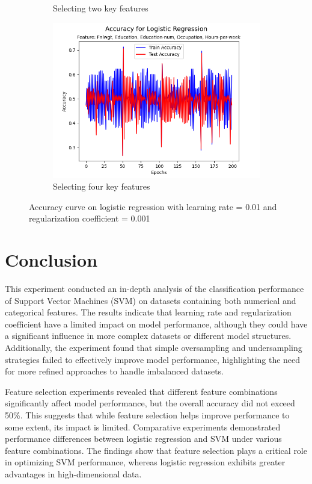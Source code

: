 \documentclass[a4paper, utf8]{ctexart}
\begin{document}
\begin{figure}[htbp]
\begin{subfigure}{.32\textwidth}
			\caption{Selecting two key features}
		\end{subfigure}
		\begin{subfigure}{.32\textwidth}
			\centering
			\includegraphics[width=.9\textwidth]{./figure/myplotL3.png}
			\caption{Selecting four key features}
		\end{subfigure}
		\caption{Accuracy curve on logistic regression with learning rate = 0.01 and regularization coefficient = 0.001}
	\end{figure}
	
	\section{Conclusion}
	
	This experiment conducted an in-depth analysis of the classification performance of Support Vector Machines (SVM) on datasets containing both numerical and categorical features. The results indicate that learning rate and regularization coefficient have a limited impact on model performance, although they could have a significant influence in more complex datasets or different model structures. Additionally, the experiment found that simple oversampling and undersampling strategies failed to effectively improve model performance, highlighting the need for more refined approaches to handle imbalanced datasets.
	
	Feature selection experiments revealed that different feature combinations significantly affect model performance, but the overall accuracy did not exceed 50\%. This suggests that while feature selection helps improve performance to some extent, its impact is limited. Comparative experiments demonstrated performance differences between logistic regression and SVM under various feature combinations. The findings show that feature selection plays a critical role in optimizing SVM performance, whereas logistic regression exhibits greater advantages in high-dimensional data.
	
\end{document}
